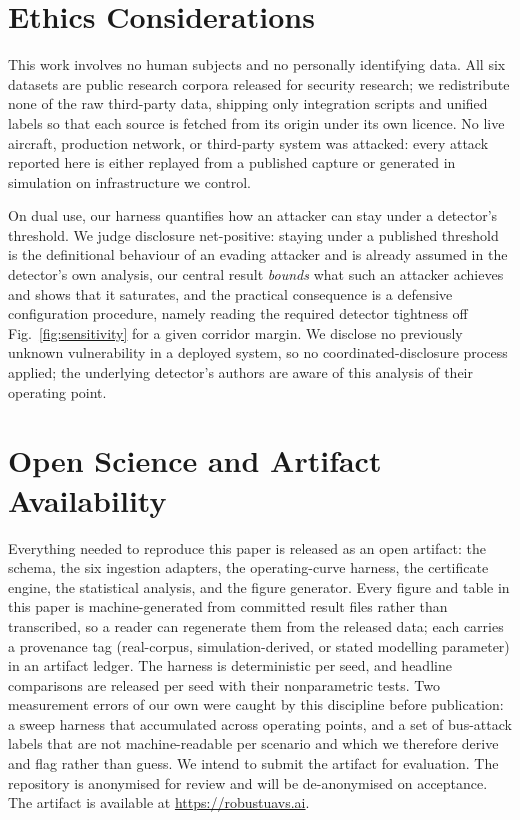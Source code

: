 \section{Ethics Considerations}
\label{sec:ethics}
This work involves no human subjects and no personally identifying data. All six
datasets are public research corpora released for security research; we
redistribute none of the raw third-party data, shipping only integration scripts
and unified labels so that each source is fetched from its origin under its own
licence. No live aircraft, production network, or third-party system was
attacked: every attack reported here is either replayed from a published capture
or generated in simulation on infrastructure we control.

On dual use, our harness quantifies how an attacker can stay under a detector's
threshold. We judge disclosure net-positive: staying under a published threshold
is the definitional behaviour of an evading attacker and is already assumed in
the detector's own analysis, our central result \emph{bounds} what such an
attacker achieves and shows that it saturates, and the practical consequence is
a defensive configuration procedure, namely reading the required detector
tightness off Fig.~\ref{fig:sensitivity} for a given corridor margin. We
disclose no previously unknown vulnerability in a deployed system, so no
coordinated-disclosure process applied; the underlying detector's authors are
aware of this analysis of their operating point.

\section{Open Science and Artifact Availability}
\label{sec:openscience}
Everything needed to reproduce this paper is released as an open artifact: the
schema, the six ingestion adapters, the operating-curve harness, the
certificate engine, the statistical analysis, and the figure generator. Every
figure and table in this paper is machine-generated from committed result files
rather than transcribed, so a reader can regenerate them from the released data;
each carries a provenance tag (real-corpus, simulation-derived, or stated
modelling parameter) in an artifact ledger. The harness is deterministic per
seed, and headline comparisons are released per seed with their nonparametric
tests. Two measurement errors of our own were caught by this discipline before
publication: a sweep harness that accumulated across operating points, and a set
of bus-attack labels that are not machine-readable per scenario and which we
therefore derive and flag rather than guess. We intend to submit the artifact for evaluation.
\ifanon
The repository is anonymised for review and will be de-anonymised on acceptance.
\else
The artifact is available at \url{https://robustuavs.ai}.
\fi

